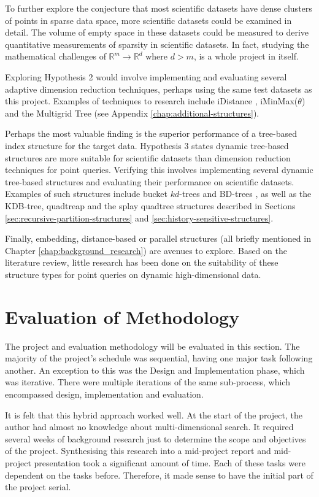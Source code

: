 To further explore the conjecture that most scientific datasets have dense clusters of points in sparse data space, more scientific datasets could be examined in detail. The volume of empty space in these datasets could be measured to derive quantitative measurements of sparsity in scientific datasets. In fact, studying the mathematical challenges of $\mathbb{R}^m \rightarrow \mathbb{R}^d$ where $d > m$, is a whole project in itself.

Exploring Hypothesis 2 would involve implementing and evaluating several adaptive dimension reduction techniques, perhaps using the same test datasets as this project. Examples of techniques to research include iDistance \cite{idistance}, iMinMax($\theta$) and the Multigrid Tree (see Appendix \ref{chap:additional-structures}).

Perhaps the most valuable finding is the superior performance of a tree-based index structure for the target data. Hypothesis 3 states dynamic tree-based structures are more suitable for scientific datasets than dimension reduction techniques for point queries. Verifying this involves implementing several dynamic tree-based structures and evaluating their performance on scientific datasets. Examples of such structures include bucket $kd$-trees and BD-trees \cite{kdtree-v-bdtree}, as well as the KDB-tree, quadtreap and the splay quadtree structures described in Sections \ref{sec:recursive-partition-structures} and \ref{sec:history-sensitive-structures}.

Finally, embedding, distance-based or parallel structures (all briefly mentioned in Chapter \ref{chap:background_research}) are avenues to explore. Based on the literature review, little research has been done on the suitability of these structure types for point queries on dynamic high-dimensional data.

\section{Evaluation of Methodology}

The project and evaluation methodology will be evaluated in this section. The majority of the project's schedule was sequential, having one major task following another. An exception to this was the Design and Implementation phase, which was iterative. There were multiple iterations of the same sub-process, which encompassed design, implementation and evaluation. 

It is felt that this hybrid approach worked well. At the start of the project, the author had almost no knowledge about multi-dimensional search. It required several weeks of background research just to determine the scope and objectives of the project. Synthesising this research into a mid-project report and mid-project presentation took a significant amount of time. Each of these tasks were dependent on the tasks before. Therefore, it made sense to have the initial part of the project serial.

